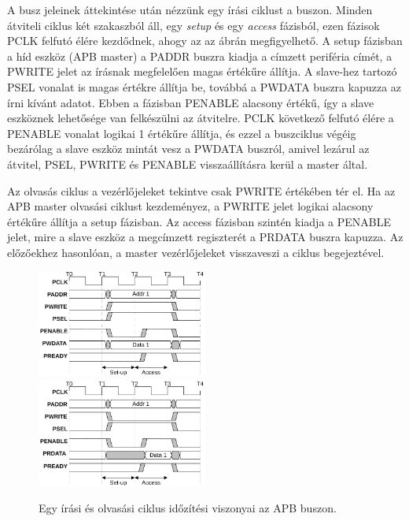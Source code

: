 {    A busz jeleinek áttekintése után nézzünk egy írási ciklust a buszon. Minden átviteli ciklus két szakaszból áll, egy \emph{setup} és egy \emph{access} fázisból, ezen fázisok PCLK felfutó élére kezdődnek, ahogy az az  ábrán megfigyelhető. A setup fázisban a híd eszköz (APB master) a PADDR buszra kiadja a címzett periféria címét, a PWRITE jelet az írásnak megfelelően magas értékűre állítja. A slave-hez tartozó PSEL vonalat is magas értékre állítja be, továbbá a PWDATA buszra kapuzza az írni kívánt adatot. Ebben a fázisban PENABLE alacsony értékű, így a slave eszköznek lehetősége van felkészülni az átvitelre. PCLK következő felfutó élére a PENABLE vonalat logikai 1 értékűre állítja, és ezzel a buszciklus végéig bezárólag a slave eszköz mintát vesz a PWDATA buszról, amivel lezárul az átvitel, PSEL, PWRITE és PENABLE visszaállításra kerül a master által.

    Az olvasás ciklus a vezérlőjeleket tekintve csak PWRITE értékében tér el. Ha az APB master olvasási ciklust kezdeményez, a PWRITE jelet logikai alacsony értékűre állítja a setup fázisban. Az access fázisban szintén kiadja a PENABLE jelet, mire a slave eszköz a megcímzett regiszterét a PRDATA buszra kapuzza. Az előzőekhez hasonlóan, a master vezérlőjeleket visszaveszi a ciklus begejeztével.

    \begin{figure}[ht!]
        \includegraphics[width = 0.5\textwidth]{figures/apb_write_transfer_no_wait_states}
        \includegraphics[width = 0.5\textwidth]{figures/apb_read_transfer_no_wait_states}
        \caption{Egy írási és olvasási ciklus időzítési viszonyai az APB buszon.}
        \label{fig:APBtransfers}
    \end{figure}

}

